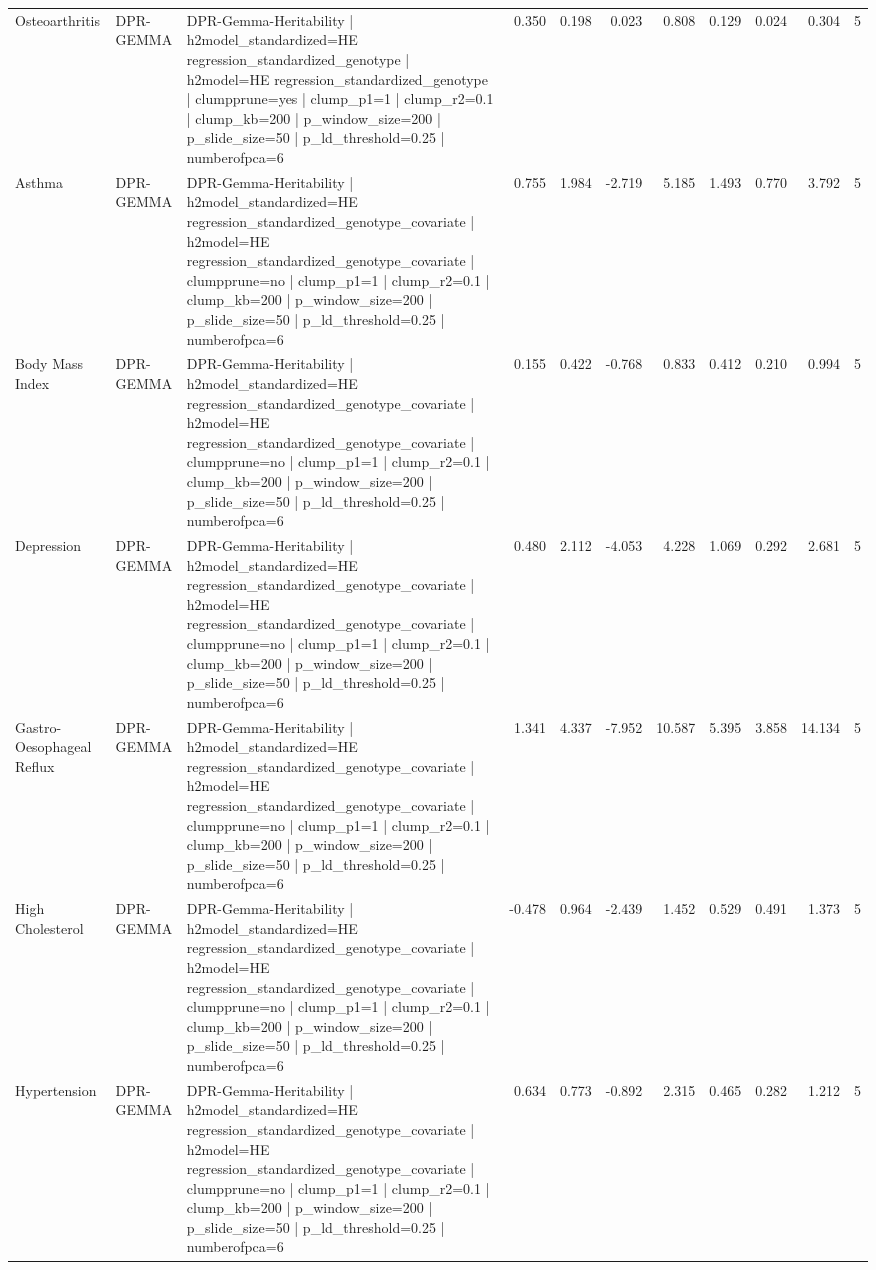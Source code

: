 \begin{landscape}
\begin{longtable}{p{2.4cm}p{1.8cm}p{6.0cm}rrrrrrrr}
Osteoarthritis & DPR-GEMMA & DPR-Gemma-Heritability | h2model\_standardized=HE regression\_standardized\_genotype | h2model=HE regression\_standardized\_genotype | clumpprune=yes | clump\_p1=1 | clump\_r2=0.1 | clump\_kb=200 | p\_window\_size=200 | p\_slide\_size=50 | p\_ld\_threshold=0.25 | numberofpca=6 & 0.350 & 0.198 & 0.023 & 0.808 & 0.129 & 0.024 & 0.304 & 5 \\
Asthma & DPR-GEMMA & DPR-Gemma-Heritability | h2model\_standardized=HE regression\_standardized\_genotype\_covariate | h2model=HE regression\_standardized\_genotype\_covariate | clumpprune=no | clump\_p1=1 | clump\_r2=0.1 | clump\_kb=200 | p\_window\_size=200 | p\_slide\_size=50 | p\_ld\_threshold=0.25 | numberofpca=6 & 0.755 & 1.984 & -2.719 & 5.185 & 1.493 & 0.770 & 3.792 & 5 \\
Body Mass Index & DPR-GEMMA & DPR-Gemma-Heritability | h2model\_standardized=HE regression\_standardized\_genotype\_covariate | h2model=HE regression\_standardized\_genotype\_covariate | clumpprune=no | clump\_p1=1 | clump\_r2=0.1 | clump\_kb=200 | p\_window\_size=200 | p\_slide\_size=50 | p\_ld\_threshold=0.25 | numberofpca=6 & 0.155 & 0.422 & -0.768 & 0.833 & 0.412 & 0.210 & 0.994 & 5 \\
Depression & DPR-GEMMA & DPR-Gemma-Heritability | h2model\_standardized=HE regression\_standardized\_genotype\_covariate | h2model=HE regression\_standardized\_genotype\_covariate | clumpprune=no | clump\_p1=1 | clump\_r2=0.1 | clump\_kb=200 | p\_window\_size=200 | p\_slide\_size=50 | p\_ld\_threshold=0.25 | numberofpca=6 & 0.480 & 2.112 & -4.053 & 4.228 & 1.069 & 0.292 & 2.681 & 5 \\
Gastro-Oesophageal Reflux & DPR-GEMMA & DPR-Gemma-Heritability | h2model\_standardized=HE regression\_standardized\_genotype\_covariate | h2model=HE regression\_standardized\_genotype\_covariate | clumpprune=no | clump\_p1=1 | clump\_r2=0.1 | clump\_kb=200 | p\_window\_size=200 | p\_slide\_size=50 | p\_ld\_threshold=0.25 | numberofpca=6 & 1.341 & 4.337 & -7.952 & 10.587 & 5.395 & 3.858 & 14.134 & 5 \\
High Cholesterol & DPR-GEMMA & DPR-Gemma-Heritability | h2model\_standardized=HE regression\_standardized\_genotype\_covariate | h2model=HE regression\_standardized\_genotype\_covariate | clumpprune=no | clump\_p1=1 | clump\_r2=0.1 | clump\_kb=200 | p\_window\_size=200 | p\_slide\_size=50 | p\_ld\_threshold=0.25 | numberofpca=6 & -0.478 & 0.964 & -2.439 & 1.452 & 0.529 & 0.491 & 1.373 & 5 \\
Hypertension & DPR-GEMMA & DPR-Gemma-Heritability | h2model\_standardized=HE regression\_standardized\_genotype\_covariate | h2model=HE regression\_standardized\_genotype\_covariate | clumpprune=no | clump\_p1=1 | clump\_r2=0.1 | clump\_kb=200 | p\_window\_size=200 | p\_slide\_size=50 | p\_ld\_threshold=0.25 | numberofpca=6 & 0.634 & 0.773 & -0.892 & 2.315 & 0.465 & 0.282 & 1.212 & 5 \\

\end{longtable}
\end{landscape}
